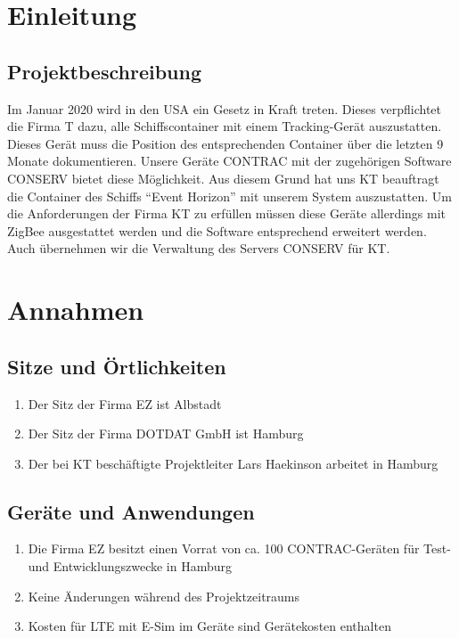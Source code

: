 %
%
%
%
%
%
%
%
%


\section{Einleitung}
\subsection{Projektbeschreibung}
Im Januar 2020 wird in den USA ein Gesetz in Kraft treten. Dieses verpflichtet die Firma T dazu, alle Schiffscontainer mit einem Tracking-Gerät auszustatten. Dieses Gerät muss die Position des entsprechenden Container über die letzten 9 Monate dokumentieren. Unsere Geräte CONTRAC mit der zugehörigen Software CONSERV bietet diese Möglichkeit. Aus diesem Grund hat uns KT beauftragt die Container des Schiffs "`Event Horizon"' mit unserem System auszustatten. Um die Anforderungen der Firma KT zu erfüllen müssen diese Geräte allerdings mit ZigBee ausgestattet werden und die Software entsprechend erweitert werden. Auch übernehmen wir die Verwaltung des Servers CONSERV für KT.
\section{Annahmen}
\subsection{Sitze und Örtlichkeiten}
\begin{enumerate}
    \item Der Sitz der Firma EZ ist Albstadt
    \item Der Sitz der Firma DOTDAT GmbH ist Hamburg
    \item Der bei KT beschäftigte Projektleiter Lars Haekinson arbeitet in Hamburg
\end{enumerate}

\subsection{Geräte und Anwendungen}
\begin{enumerate}
    \item Die Firma EZ besitzt einen Vorrat von ca. 100 CONTRAC-Geräten für Test- und Entwicklungszwecke in Hamburg
    \item Keine Änderungen während des Projektzeitraums
    \item Kosten für LTE mit E-Sim im Geräte sind Gerätekosten enthalten
\end{enumerate}

